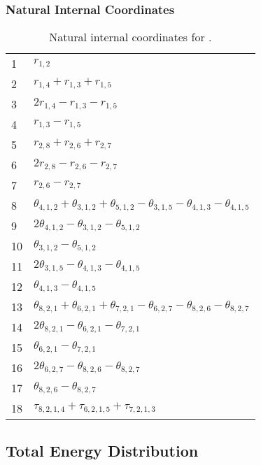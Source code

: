 \documentclass[10pt,oneside]{article}
\begin{document}
\begin{table}[h!]
\subsubsection*{Natural Internal Coordinates}
\centering
\caption{Natural internal coordinates for .}
\small
\begin{tabular}{ll}
\toprule
  1   & $r_{1,2}$ \\
  2   & $r_{1,4} + r_{1,3} + r_{1,5}$ \\
  3   & $2r_{1,4} - r_{1,3} - r_{1,5}$ \\
  4   & $r_{1,3} - r_{1,5}$ \\
  5   & $r_{2,8} + r_{2,6} + r_{2,7}$ \\
  6   & $2r_{2,8} - r_{2,6} - r_{2,7}$ \\
  7   & $r_{2,6} - r_{2,7}$ \\
  8   & $\theta_{4,1,2} + \theta_{3,1,2} + \theta_{5,1,2} - \theta_{3,1,5} - \theta_{4,1,3} - \theta_{4,1,5}$ \\
  9   & $2\theta_{4,1,2} - \theta_{3,1,2} - \theta_{5,1,2}$ \\
  10  & $\theta_{3,1,2} - \theta_{5,1,2}$ \\
  11  & $2\theta_{3,1,5} - \theta_{4,1,3} - \theta_{4,1,5}$ \\
  12  & $\theta_{4,1,3} - \theta_{4,1,5}$ \\
  13  & $\theta_{8,2,1} + \theta_{6,2,1} + \theta_{7,2,1} - \theta_{6,2,7} - \theta_{8,2,6} - \theta_{8,2,7}$ \\
  14  & $2\theta_{8,2,1} - \theta_{6,2,1} - \theta_{7,2,1}$ \\
  15  & $\theta_{6,2,1} - \theta_{7,2,1}$ \\
  16  & $2\theta_{6,2,7} - \theta_{8,2,6} - \theta_{8,2,7}$ \\
  17  & $\theta_{8,2,6} - \theta_{8,2,7}$ \\
  18  & $\tau_{8,2,1,4} + \tau_{6,2,1,5} + \tau_{7,2,1,3}$ \\
\bottomrule
\end{tabular}
\end{table}

\begin{table}
\subsection*{Total Energy Distribution}
\centering\end{table}
\end{document}
